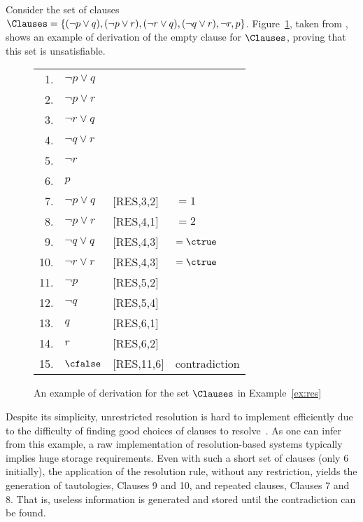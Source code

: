 \begin{example}%
\label{ex:res}
    Consider the set of clauses $\Clauses = \{(\neg p \lor q), (\neg p \lor r),
    (\neg r \lor q), (\neg q \lor r), \neg r, p\}$. Figure~\ref{tab:res}, taken from \cite{Nalon2015-notas}, shows an
    example of derivation of the empty clause for $\Clauses$, proving that this
    set is unsatisfiable. 

    \begin{figure}%
        \centering
        \begin{tabular}{rlll}
            1. & $\neg p \lor q$ & & \\
            2. & $\neg p \lor r$ & & \\
            3. & $\neg r \lor q$ & & \\
            4. & $\neg q \lor r$ & & \\
            5. & $\neg r$ & & \\
            6. & $p$ & & \\
            7. & $\neg p \lor q$ & [RES,3,2] & $= 1$\\
            8. & $\neg p \lor r$ & [RES,4,1] & $= 2$\\
            9. & $\neg q \lor q$ & [RES,4,3] & $= \ctrue$\\
            10.&  $\neg r \lor r$ & [RES,4,3] & $= \ctrue$\\
            11.&  $\neg p$ & [RES,5,2] & \\
            12.&  $\neg q$ & [RES,5,4] & \\
            13.&  $q$ & [RES,6,1] & \\
            14.&  $r$ & [RES,6,2] & \\
            15.&  $\cfalse$ & [RES,11,6] & contradiction\\
        \end{tabular}%
    \caption{An example of derivation for the set $\Clauses$ in Example~\ref{ex:res}}%
    \label{tab:res}
    \end{figure}

    Despite its simplicity, unrestricted resolution is hard to implement
    efficiently due to the difficulty of finding good choices of clauses to
    resolve~\cite{satchapter}. As one can infer from this example, a raw
    implementation of resolution-based systems typically implies huge storage
    requirements. Even with such a short set of clauses (only 6 initially), the
    application of the resolution rule, without any restriction, yields the
    generation of tautologies, Clauses 9 and 10, and repeated clauses, Clauses 7
    and 8. That is, useless information is generated and stored until the
    contradiction can be found. %
\end{example}

